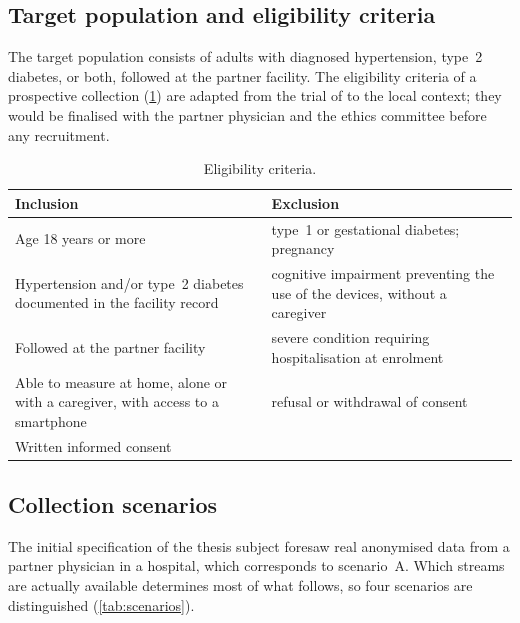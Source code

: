 \subsection{Target population and eligibility criteria}\label{sec:eligibility}

The target population consists of adults with diagnosed hypertension, type~2 diabetes, or both, followed at the partner facility. The eligibility criteria of a prospective collection (\cref{tab:eligibility}) are adapted from the trial of \textcite{mihevc2025} to the local context; they would be finalised with the partner physician and the ethics committee before any recruitment.

\begin{table}[htbp]
\centering\small
\caption{Eligibility criteria.}\label{tab:eligibility}
\begin{tabularx}{\textwidth}{@{}X X@{}}
\toprule
\textbf{Inclusion} & \textbf{Exclusion} \\
\midrule
Age 18 years or more & type~1 or gestational diabetes; pregnancy \\
Hypertension and/or type~2 diabetes documented in the facility record & cognitive impairment preventing the use of the devices, without a caregiver \\
Followed at the partner facility & severe condition requiring hospitalisation at enrolment \\
Able to measure at home, alone or with a caregiver, with access to a smartphone & refusal or withdrawal of consent \\
Written informed consent & \\
\bottomrule
\end{tabularx}
\end{table}

\subsection{Collection scenarios}\label{sec:scenarios}

The initial specification of the thesis subject foresaw real anonymised data from a partner physician in a hospital, which corresponds to scenario~A. Which streams are actually available determines most of what follows, so four scenarios are distinguished (\cref{tab:scenarios}).

